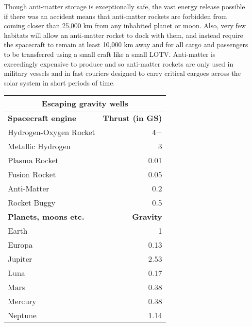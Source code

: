 {{Though anti-matter storage is exceptionally safe, the vast energy release possible if there was an accident means that anti-matter rockets are forbidden from coming closer than 25,000 km from any inhabited planet or moon. Also, very few habitats will allow an anti-matter rocket to dock with them, and instead require the spacecraft to remain at least 10,000 km away and for all cargo and passengers to be transferred using a small craft like a small LOTV. Anti-matter is exceedingly expensive to produce and so anti-matter rockets are only used in military vessels and in fast couriers designed to carry critical cargoes across the solar system in short periods of time. 

\begin{table} \begin{tabular}{|l|r} \hline

\multicolumn{2}{|c|}{\textbf{Escaping gravity wells}} \\ \hline

\textbf{Spacecraft engine}	&\textbf{Thrust (in GS)} \\ \hline

Hydrogen-Oxygen Rocket	&4+ \\ \hline

Metallic Hydrogen	&3 \\ \hline

Plasma Rocket	&0.01 \\ \hline

Fusion Rocket	&0.05 \\ \hline

Anti-Matter	&0.2 \\ \hline

Rocket Buggy	&0.5 \\ \hline

\textbf{Planets, moons etc.}	&\textbf{Gravity} \\ \hline

Earth	&1 \\ \hline

Europa	&0.13 \\ \hline

Jupiter	&2.53 \\ \hline

Luna	&0.17 \\ \hline

Mars	&0.38 \\ \hline

Mercury	&0.38 \\ \hline

Neptune	&1.14 \\ \hline


\end{tabular}
\end{table}}}

